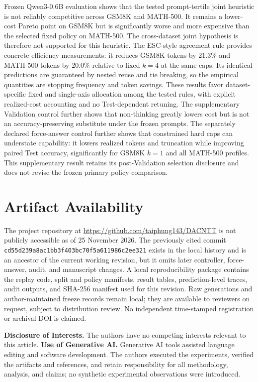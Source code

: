 \documentclass[runningheads]{llncs}
\begin{document}
Frozen Qwen3-0.6B evaluation shows that the tested prompt-tertile joint
heuristic is not reliably competitive across GSM8K and MATH-500. It remains a
lower-cost Pareto point on GSM8K but is significantly worse and more expensive
than the selected fixed policy on MATH-500. The cross-dataset joint hypothesis
is therefore not supported for this heuristic. The ESC-style agreement rule
provides concrete efficiency measurements: it reduces GSM8K tokens by 21.3\%
and MATH-500 tokens by 20.0\% relative to fixed $k=4$ at the same caps. Its
identical predictions are guaranteed by nested reuse and tie breaking, so the
empirical quantities are stopping frequency and token savings. These results
favor dataset-specific fixed and single-axis allocation among the tested rules, with explicit
realized-cost accounting and no Test-dependent retuning. The supplementary
Validation control further shows that non-thinking greatly lowers cost but is
not an accuracy-preserving substitute under the frozen prompts. The separately
declared force-answer control further shows that constrained hard caps can
understate capability: it lowers realized tokens and truncation while improving
paired Test accuracy, significantly for GSM8K $k=1$ and all MATH-500 profiles.
This supplementary result retains its post-Validation selection disclosure and
does not revise the frozen primary policy comparison.

\section*{Artifact Availability}

The project repository at \url{https://github.com/taiphung143/DACNTT} is not
publicly accessible as of 25 November 2026. The previously cited commit
\texttt{cd55d239a8ac1bb3f403bc70f5a611986c2ee321} exists in the local history and
is an ancestor of the current working revision, but it omits later controller,
force-answer, audit, and manuscript changes. A local reproducibility package
contains the replay code, split and policy manifests, result tables,
prediction-level traces, audit outputs, and SHA-256 manifest used for this
revision. Raw generations and author-maintained freeze records remain local;
they are available to reviewers on request, subject to distribution review.
No independent time-stamped registration or archival DOI is claimed.

\begin{credits}
\noindent\textbf{Disclosure of Interests.} The authors have no
competing interests relevant to this article. \textbf{Use of Generative AI.}
Generative AI tools assisted language editing and software development. The
authors executed the experiments, verified the artifacts and references, and
retain responsibility for all methodology, analysis, and claims; no synthetic
experimental observations were introduced.
\end{credits}
\end{document}
